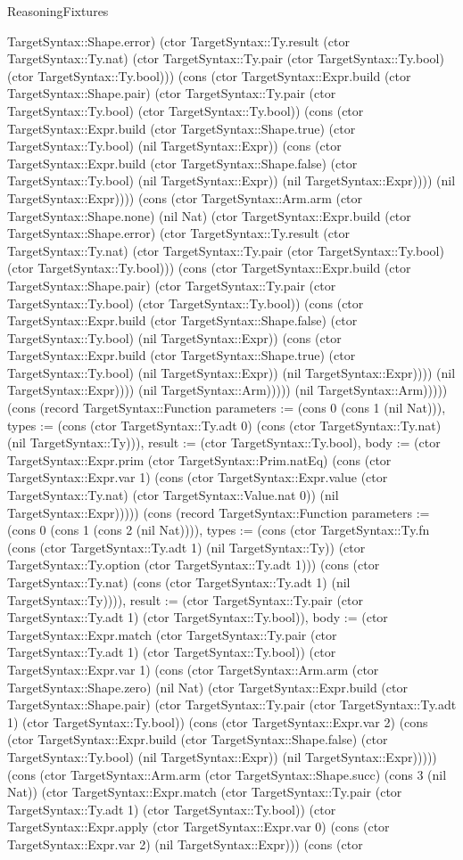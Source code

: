 \begin{lexlean}{ReasoningFixtures}
\begin{semanticmodule}
{TargetSyntax::Shape.error) (ctor TargetSyntax::Ty.result (ctor TargetSyntax::Ty.nat) (ctor TargetSyntax::Ty.pair (ctor TargetSyntax::Ty.bool) (ctor TargetSyntax::Ty.bool))) (cons (ctor TargetSyntax::Expr.build (ctor TargetSyntax::Shape.pair) (ctor TargetSyntax::Ty.pair (ctor TargetSyntax::Ty.bool) (ctor TargetSyntax::Ty.bool)) (cons (ctor TargetSyntax::Expr.build (ctor TargetSyntax::Shape.true) (ctor TargetSyntax::Ty.bool) (nil TargetSyntax::Expr)) (cons (ctor TargetSyntax::Expr.build (ctor TargetSyntax::Shape.false) (ctor TargetSyntax::Ty.bool) (nil TargetSyntax::Expr)) (nil TargetSyntax::Expr)))) (nil TargetSyntax::Expr)))) (cons (ctor TargetSyntax::Arm.arm (ctor TargetSyntax::Shape.none) (nil Nat) (ctor TargetSyntax::Expr.build (ctor TargetSyntax::Shape.error) (ctor TargetSyntax::Ty.result (ctor TargetSyntax::Ty.nat) (ctor TargetSyntax::Ty.pair (ctor TargetSyntax::Ty.bool) (ctor TargetSyntax::Ty.bool))) (cons (ctor TargetSyntax::Expr.build (ctor TargetSyntax::Shape.pair) (ctor TargetSyntax::Ty.pair (ctor TargetSyntax::Ty.bool) (ctor TargetSyntax::Ty.bool)) (cons (ctor TargetSyntax::Expr.build (ctor TargetSyntax::Shape.false) (ctor TargetSyntax::Ty.bool) (nil TargetSyntax::Expr)) (cons (ctor TargetSyntax::Expr.build (ctor TargetSyntax::Shape.true) (ctor TargetSyntax::Ty.bool) (nil TargetSyntax::Expr)) (nil TargetSyntax::Expr)))) (nil TargetSyntax::Expr)))) (nil TargetSyntax::Arm))))) (nil TargetSyntax::Arm))))}) (cons (record TargetSyntax::Function {parameters := (cons 0 (cons 1 (nil Nat))), types := (cons (ctor TargetSyntax::Ty.adt 0) (cons (ctor TargetSyntax::Ty.nat) (nil TargetSyntax::Ty))), result := (ctor TargetSyntax::Ty.bool), body := (ctor TargetSyntax::Expr.prim (ctor TargetSyntax::Prim.natEq) (cons (ctor TargetSyntax::Expr.var 1) (cons (ctor TargetSyntax::Expr.value (ctor TargetSyntax::Ty.nat) (ctor TargetSyntax::Value.nat 0)) (nil TargetSyntax::Expr))))}) (cons (record TargetSyntax::Function {parameters := (cons 0 (cons 1 (cons 2 (nil Nat)))), types := (cons (ctor TargetSyntax::Ty.fn (cons (ctor TargetSyntax::Ty.adt 1) (nil TargetSyntax::Ty)) (ctor TargetSyntax::Ty.option (ctor TargetSyntax::Ty.adt 1))) (cons (ctor TargetSyntax::Ty.nat) (cons (ctor TargetSyntax::Ty.adt 1) (nil TargetSyntax::Ty)))), result := (ctor TargetSyntax::Ty.pair (ctor TargetSyntax::Ty.adt 1) (ctor TargetSyntax::Ty.bool)), body := (ctor TargetSyntax::Expr.match (ctor TargetSyntax::Ty.pair (ctor TargetSyntax::Ty.adt 1) (ctor TargetSyntax::Ty.bool)) (ctor TargetSyntax::Expr.var 1) (cons (ctor TargetSyntax::Arm.arm (ctor TargetSyntax::Shape.zero) (nil Nat) (ctor TargetSyntax::Expr.build (ctor TargetSyntax::Shape.pair) (ctor TargetSyntax::Ty.pair (ctor TargetSyntax::Ty.adt 1) (ctor TargetSyntax::Ty.bool)) (cons (ctor TargetSyntax::Expr.var 2) (cons (ctor TargetSyntax::Expr.build (ctor TargetSyntax::Shape.false) (ctor TargetSyntax::Ty.bool) (nil TargetSyntax::Expr)) (nil TargetSyntax::Expr))))) (cons (ctor TargetSyntax::Arm.arm (ctor TargetSyntax::Shape.succ) (cons 3 (nil Nat)) (ctor TargetSyntax::Expr.match (ctor TargetSyntax::Ty.pair (ctor TargetSyntax::Ty.adt 1) (ctor TargetSyntax::Ty.bool)) (ctor TargetSyntax::Expr.apply (ctor TargetSyntax::Expr.var 0) (cons (ctor TargetSyntax::Expr.var 2) (nil TargetSyntax::Expr))) (cons (ctor }
\end{semanticmodule}
\end{lexlean}
